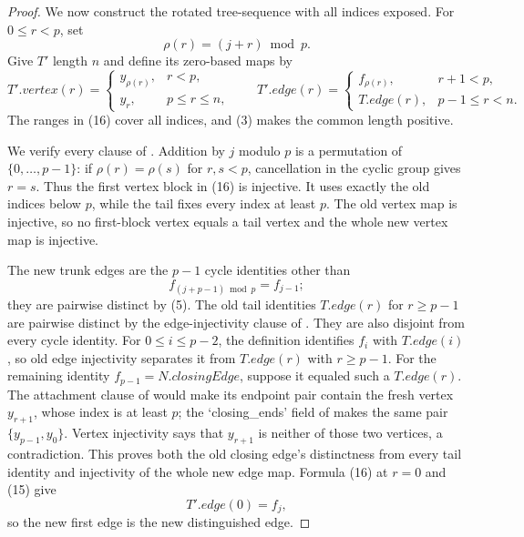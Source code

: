 \begin{proof}
We now construct the rotated tree-sequence with all indices exposed.  For
$0\leq r<p$, set
\[
                 \rho(r)=(j+r)\bmod p.                           \tag{15}
\]
Give $T'$ length $n$ and define its zero-based maps by
\[
 T'.vertex(r)=
 \begin{cases}
  y_{\rho(r)},&r<p,\\
  y_r,&p\leq r\leq n,
 \end{cases}
 \qquad
 T'.edge(r)=
 \begin{cases}
  f_{\rho(r)},&r+1<p,\\
  T.edge(r),&p-1\leq r<n.
 \end{cases}                                                     \tag{16}
\]
The ranges in (16) cover all indices, and (3) makes the common length
positive.

We verify every clause of .  Addition by $j$ modulo
$p$ is a permutation of $\{0,\ldots,p-1\}$: if
$\rho(r)=\rho(s)$ for $r,s<p$, cancellation in the cyclic group gives
$r=s$.  Thus the first vertex block in (16) is injective.  It uses exactly
the old indices below $p$, while the tail fixes every index at least $p$.
The old vertex map is injective, so no first-block vertex equals a tail
vertex and the whole new vertex map is injective.

The new trunk edges are the $p-1$ cycle identities other than
\[
        f_{(j+p-1)\bmod p}=f_{j-1};                              \tag{17}
\]
they are pairwise distinct by (5).  The old tail identities
$T.edge(r)$ for $r\geq p-1$ are pairwise distinct by the edge-injectivity
clause of .  They are also disjoint from every
cycle identity.  For $0\leq i\leq p-2$, the definition
 identifies $f_i$ with $T.edge(i)$, so old edge
injectivity separates it from $T.edge(r)$ with $r\geq p-1$.  For the
remaining identity $f_{p-1}=N.closingEdge$, suppose it equaled such a
$T.edge(r)$.  The attachment clause of  would make
its endpoint pair contain the fresh vertex $y_{r+1}$, whose index is at
least $p$; the `closing_ends' field of
 makes the same pair
$\{y_{p-1},y_0\}$.  Vertex injectivity says that $y_{r+1}$ is neither of
those two vertices, a contradiction.  This proves both the old closing
edge's distinctness from every tail identity and injectivity of the whole
new edge map.  Formula (16) at $r=0$ and (15) give
\[
                         T'.edge(0)=f_j,                         \tag{18}
\]
so the new first edge is the new distinguished edge.


\end{proof}
